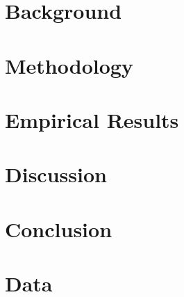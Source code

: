 \documentclass[a4paper,12pt]{article}
\theoremstyle{definition}
\begin{document}


\section{Background} \label{s:background}



\section{Methodology} \label{s:method}



\section{Empirical Results} \label{s:emp}



\section{Discussion} \label{s:discuss}



\section{Conclusion} \label{s:concl}






\clearpage
\footnotesize
\appendix
\renewcommand{\thesection}{\Alph{section}}

\section{Data} \label{a:data}
\end{document}
